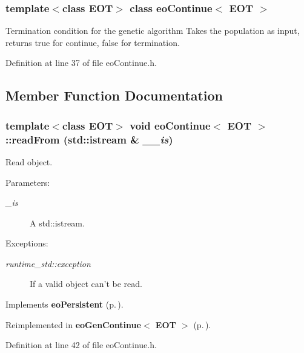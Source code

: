 \subsubsection*{template$<$class EOT$>$ class eo\-Continue$<$ EOT $>$}

Termination condition for the genetic algorithm Takes the population as input, returns true for continue, false for termination. 



Definition at line 37 of file eo\-Continue.h.

\subsection{Member Function Documentation}
\subsubsection{\setlength{\rightskip}{0pt plus 5cm}template$<$class EOT$>$ void {\bf eo\-Continue}$<$ {\bf EOT} $>$::read\-From (std::istream \& {\em \_\-\_\-is})\hspace{0.3cm}{\tt  [inline, virtual]}}\label{classeo_continue_a1}


Read object. 

\begin{Desc}
\item[Parameters:]
\begin{description}
\item[{\em \_\-is}]A std::istream. \end{description}
\end{Desc}
\begin{Desc}
\item[Exceptions:]
\begin{description}
\item[{\em runtime\_\-std::exception}]If a valid object can't be read. \end{description}
\end{Desc}


Implements {\bf eo\-Persistent} {\rm (p.\,\pageref{classeo_persistent_a1})}.

Reimplemented in {\bf eo\-Gen\-Continue$<$ EOT $>$} {\rm (p.\,\pageref{classeo_gen_continue_a6})}.

Definition at line 42 of file eo\-Continue.h.
